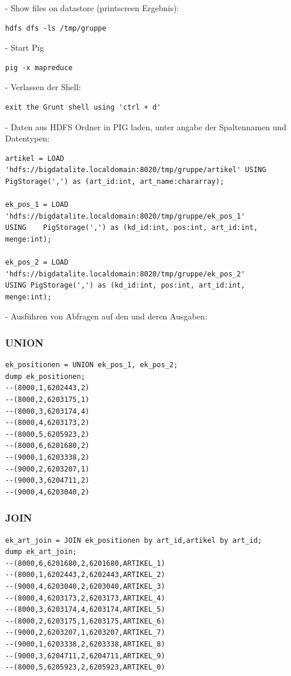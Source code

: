 \begin{itemize}
\item[-] Show files on datastore (printscreen Ergebnis):
\begin{lstlisting}
hdfs dfs -ls /tmp/gruppe
\end{lstlisting}

\item[-] Start Pig
\begin{lstlisting}
pig -x mapreduce
\end{lstlisting}

\item[-] Verlassen der Shell: 
\begin{lstlisting}
exit the Grunt shell using 'ctrl + d'
\end{lstlisting}

\item[-] Daten aus HDFS Ordner in PIG laden, unter angabe der Spaltennamen und Datentypen:
\begin{lstlisting}
artikel = LOAD 'hdfs://bigdatalite.localdomain:8020/tmp/gruppe/artikel' USING
PigStorage(',') as (art_id:int, art_name:chararray);

ek_pos_1 = LOAD 'hdfs://bigdatalite.localdomain:8020/tmp/gruppe/ek_pos_1'       USING    PigStorage(',') as (kd_id:int, pos:int, art_id:int, menge:int);

ek_pos_2 = LOAD 'hdfs://bigdatalite.localdomain:8020/tmp/gruppe/ek_pos_2'       USING PigStorage(',') as (kd_id:int, pos:int, art_id:int, menge:int);
\end{lstlisting}
\item[-] Ausführen von Abfragen auf den und deren Ausgaben:
\subsubsection*{UNION}
\begin{lstlisting}
ek_positionen = UNION ek_pos_1, ek_pos_2;
dump ek_positionen;
--(8000,1,6202443,2)
--(8000,2,6203175,1)
--(8000,3,6203174,4)
--(8000,4,6203173,2)
--(8000,5,6205923,2)
--(8000,6,6201680,2)
--(9000,1,6203338,2)
--(9000,2,6203207,1)
--(9000,3,6204711,2)
--(9000,4,6203040,2)
\end{lstlisting}

\subsubsection*{JOIN}
\begin{lstlisting}
ek_art_join = JOIN ek_positionen by art_id,artikel by art_id;
dump ek_art_join;
--(8000,6,6201680,2,6201680,ARTIKEL_1)
--(8000,1,6202443,2,6202443,ARTIKEL_2)
--(9000,4,6203040,2,6203040,ARTIKEL_3)
--(8000,4,6203173,2,6203173,ARTIKEL_4)
--(8000,3,6203174,4,6203174,ARTIKEL_5)
--(8000,2,6203175,1,6203175,ARTIKEL_6)
--(9000,2,6203207,1,6203207,ARTIKEL_7)
--(9000,1,6203338,2,6203338,ARTIKEL_8)
--(9000,3,6204711,2,6204711,ARTIKEL_9)
--(8000,5,6205923,2,6205923,ARTIKEL_0)
\end{lstlisting}


\end{itemize}
